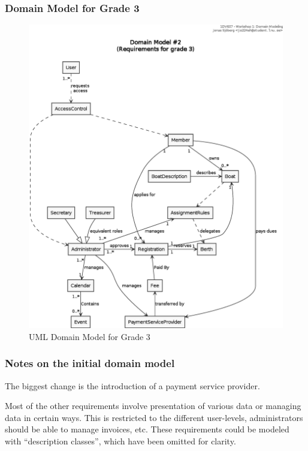 \subsubsection{Domain Model for Grade 3}
\begin{figure}[htbp]
  \centering
  \includegraphics[width=\linewidth]{uml/domain-model_2.eps}
  \caption{UML Domain Model for Grade 3}
  \label{fig:uml-domain2}
\end{figure}

\subsubsection{Notes on the initial domain model}
The biggest change is the introduction of a payment service provider.

Most of the other requirements involve presentation of various data or managing
data in certain ways.  This is restricted to the different user-levels,
administrators should be able to manage invoices, etc.  These requirements
could be modeled with ``description classes'', which have been omitted for
clarity.


